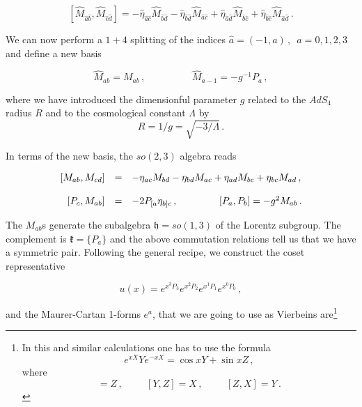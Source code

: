 \documentclass[12pt,a4paper]{article}
\begin{document}
\begin{equation}
\label{eq:AdSalgebra}
\left[\hat{M}_{\hat{a}\hat{b}},\hat{M}_{\hat{c}\hat{d}} \right]  =
-\hat{\eta}_{\hat{a}\hat{c}} \hat{M}_{\hat{b}\hat{d}} 
-\hat{\eta}_{\hat{b}\hat{d}} \hat{M}_{\hat{a}\hat{c}}
+\hat{\eta}_{\hat{a}\hat{d}} \hat{M}_{\hat{b}\hat{c}} 
+\hat{\eta}_{\hat{b}\hat{c}} \hat{M}_{\hat{a}\hat{d}}\, .
\end{equation}


We can now perform a $1+4$ splitting of the indices $\hat{a}=(-1,a)\,
,\,\,\, a=0,1,2,3$ and define a new basis 

\begin{equation}
\label{eq:contraction1}
\hat{M}_{ab} = M_{ab}\, ,
\hspace{2cm}
\hat{M}_{a-1} = -g^{-1} P_{a}\, ,
\end{equation}

\noindent 
where we have introduced the dimensionful parameter $g$ related to the
$AdS_{4}$ radius $R$ and to the cosmological constant $\Lambda$ by
%
\begin{equation}
R=1/g=\sqrt{-3/\Lambda}\, .  
\end{equation}

In terms of the new basis, the $so(2,3)$ algebra reads

\begin{equation}
\begin{array}{rcl}
\left[M_{ab},M_{cd} \right]  & = &
-\eta_{ac}M_{bd} -\eta_{bd} M_{ac}
+\eta_{ad} M_{bc} +\eta_{bc} M_{ad}\, ,\\
& & \\
\left[P_{c},M_{ab}\right]  & = & 
-2P_{[a}\eta_{b]c}\, ,
\hspace{1.5cm}
\left[P_{a},P_{b} \right]  = -g^{2}M_{ab}\, .\\
\end{array}
\end{equation}

The $M_{ab}$s generate the subalgebra $\mathfrak{h}=so(1,3)$ of the
Lorentz subgroup. The complement is $\mathfrak{k}=\{P_{a}\}$ and the
above commutation relations tell us that we have a symmetric pair.
Following the general recipe, we construct the coset representative

\begin{equation}
u(x) = e^{x^{3}P_{3}}  e^{x^{2}P_{2}}e^{x^{1}P_{1}}e^{x^{0}P_{0}}\, ,
\end{equation}

\noindent 
and the Maurer-Cartan 1-forms $e^{a}$, that we are going to use as
Vierbeins are\footnote{In this and similar calculations one has to use
  the formula
%
  \begin{equation}
  e^{xX}Ye^{-xX}= \cos{x}Y +\sin{x}Z\, ,  
  \end{equation}
%
where
%
\begin{equation}
[X,Y]=Z\, ,
\hspace{1cm}  
[Y,Z]=X\, ,
\hspace{1cm}
[Z,X]=Y\, .
\end{equation}
  }
\end{document}
